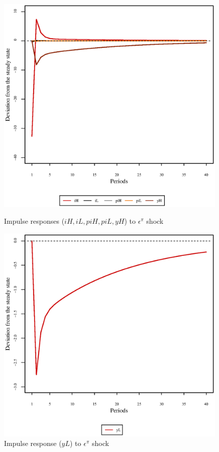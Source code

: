 \begin{figure}[h]
\begin{minipage}{0.5\textwidth}
\vspace*{-3em}
\centering
\includegraphics[width=0.99\textwidth, scale=0.55]{plots/plot_45.eps}
\caption{Impulse responses (${i\!H}, {i\!L}, {p\!i\!H}, {p\!i\!L}, {y\!H}$) to $\epsilon^{\pi}$ shock}
\end{minipage}
\begin{minipage}{0.5\textwidth}
\vspace*{-3em}
\centering
\includegraphics[width=0.99\textwidth, scale=0.55]{plots/plot_46.eps}
\caption{Impulse response (${y\!L}$) to $\epsilon^{\pi}$ shock}
\end{minipage}
\end{figure}



